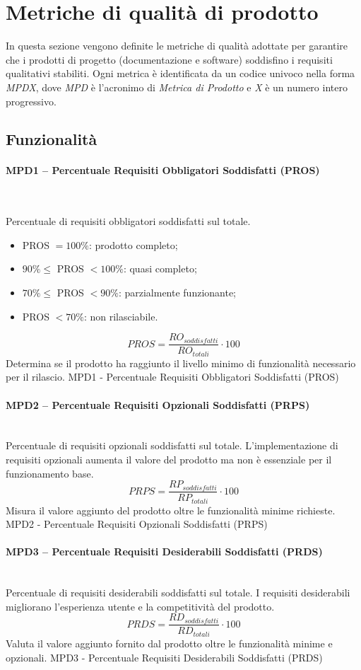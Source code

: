 \documentclass[10pt, letterpaper]{article}
\newcommand{\trisubsection}[1]{\paragraph{#1}\mbox{}\\}
\begin{document}
\section{Metriche di qualità di prodotto}
\label{sec:MetricheProdotto}
In questa sezione vengono definite le metriche di qualità adottate per garantire che i prodotti di progetto (documentazione e software) soddisfino i requisiti qualitativi stabiliti.
Ogni metrica è identificata da un codice univoco nella forma \textit{MPDX}, dove \textit{MPD} è l'acronimo di \textit{Metrica di Prodotto} e \textit{X} è un numero intero progressivo.

\subsection{Funzionalità}
\trisubsection{MPD1 -- Percentuale Requisiti Obbligatori Soddisfatti (PROS)}
{Percentuale di requisiti obbligatori soddisfatti sul totale.
    \begin{itemize}
        \item PROS $= 100\%$: prodotto completo;
        \item $90\% \leq$ PROS $< 100\%$: quasi completo;
        \item $70\% \leq$ PROS $< 90\%$: parzialmente funzionante;
        \item PROS $< 70\%$: non rilasciabile.
    \end{itemize}}
{\[ PROS = \frac{RO_{soddisfatti}}{RO_{totali}} \cdot 100\]}
{Determina se il prodotto ha raggiunto il livello minimo di funzionalità necessario per il rilascio.}
{MPD1 - Percentuale Requisiti Obbligatori Soddisfatti (PROS)}

\trisubsection{MPD2 -- Percentuale Requisiti Opzionali Soddisfatti (PRPS)}
{Percentuale di requisiti opzionali soddisfatti sul totale. L'implementazione di requisiti opzionali aumenta il valore del prodotto ma non è essenziale per il funzionamento base.}
{\[ PRPS = \frac{RP_{soddisfatti}}{RP_{totali}} \cdot 100\]}
{Misura il valore aggiunto del prodotto oltre le funzionalità minime richieste.}
{MPD2 - Percentuale Requisiti Opzionali Soddisfatti (PRPS)}

\trisubsection{MPD3 -- Percentuale Requisiti Desiderabili Soddisfatti (PRDS)}
{Percentuale di requisiti desiderabili soddisfatti sul totale. I requisiti desiderabili migliorano l'esperienza utente e la competitività del prodotto.}
{\[ PRDS = \frac{RD_{soddisfatti}}{RD_{totali}} \cdot 100\]}
{Valuta il valore aggiunto fornito dal prodotto oltre le funzionalità minime e opzionali.}
{MPD3 - Percentuale Requisiti Desiderabili Soddisfatti (PRDS)}
\end{document}
